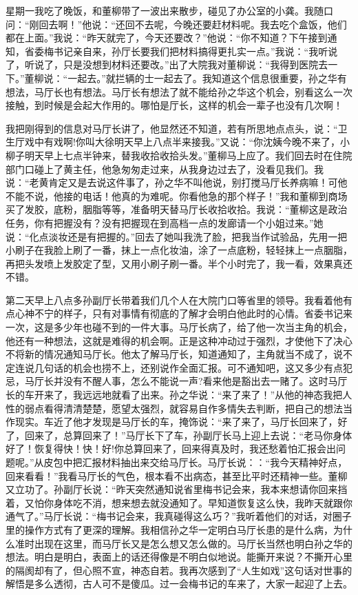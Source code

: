 \documentclass[12pt,oneside]{book}
\begin{document}
星期一我吃了晚饭，和董柳带了一波出来散步，碰见了办公室的小龚。我随口问：``刚回去啊！''他说：``还回不去呢，今晚还要赶材料呢。我去吃个盒饭，他们都在上面。''我说：``昨天就完了，今天还要改？''他说：``你不知道？下午接到通知，省委梅书记亲自来，孙厅长要我们把材料搞得更扎实一点。''我说：``我听说了，听说了，只是没想到材料还要改。''出了大院我对董柳说：``我得到医院去一下。''董柳说：``一起去。''就拦辆的士一起去了。我知道这个信息很重要，孙之华有想法，马厅长也有想法。马厅长有想法了就不能给孙之华这个机会，别看这么一次接触，到时候是会起大作用的。哪怕是厅长，这样的机会一辈子也没有几次啊！

我把刚得到的信息对马厅长讲了，他显然还不知道，若有所思地点点头，说：``卫生厅戏中有戏啊!你叫大徐明天早上八点半来接我。''又说：``你沈姨今晚不来了，小柳子明天早上七点半钟来，替我收拾收拾头发。''董柳马上应了。我们回去时在住院部门口碰上了黄主任，他急匆匆走过来，从我身边过去了，没看见我们。我说：``老黄肯定又是去说这件事了，孙之华不叫他说，别打搅马厅长养病嘛！可他不能不说，他接的电话！他真的为难呢。你看他急的那个样子！''我和董柳到商场买了发胶，底粉，胭脂等等，准备明天替马厅长收拾收拾。我说：``董柳这是政治任务，你有把握没有？没有把握现在到高档一点的发廊请一个小姐过来。''她说：``化点淡妆还是有把握的。''回去了她叫我洗了脸，把我当作试验品，先用一把小刷子在我脸上刷了一番，抹上一点化妆油，涂了一点底粉，轻轻抹上一点胭脂，再把头发喷上发胶定了型，又用小刷子刷一番。半个小时完了，我一看，效果真还不错。

第二天早上八点多孙副厅长带着我们几个人在大院门口等省里的领导。我看着他有点心神不宁的样子，只有对事情有彻底的了解才会明白他此时的心情。省委书记来一次，这是多少年也碰不到的一件大事。马厅长病了，给了他一次当主角的机会，他还有一种想法，这就是难得的机会啊。正是这种冲动过于强烈，才使他下了决心不将新的情况通知马厅长。他太了解马厅长，知道通知了，主角就当不成了，说不定连说几句话的机会也捞不上，还别说作全面汇报。可不通知吧，这又多少有点犯忌，马厅长并没有不醒人事，怎么不能说一声?看来他是豁出去一赌了。这时马厅长的车开来了，我远远地就看了出来。孙之华说：``来了来了！''从他的神态我把人性的弱点看得清清楚楚，愿望太强烈，就容易自作多情失去判断，把自己的想法当作现实。车近了他才发现是马厅长的车，掩饰说：``来了来了，马厅长回来了，好了，回来了，总算回来了！''马厅长下了车，孙副厅长马上迎上去说：``老马你身体好了！恢复得快！快！好!你总算回来了，回来得真及时，我还愁着怕汇报会出问题呢。''从皮包中把汇报材料抽出来交给马厅长。马厅长说：：``我今天精神好点，回来看看！''我看马厅长的气色，根本看不出病态，甚至比平时还精神一些。董柳又立功了。孙副厅长说：``昨天突然通知说省里梅书记会来，我本来想请你回来挡着，又怕你身体吃不消，想来想去就没通知了。早知道恢复这么快，我昨天就跟你通气了。''马厅长说：``梅书记会来，我真碰得这么巧？''我听着他们的对话，对圈子里的操作方式有了更深的理解。我相信孙之华一定明白马厅长患的是什么病，为什么准时出现在这里，而马厅长又是怎么想又怎么做的。马厅长当然也明白孙之华的想法。明白是明白，表面上的话还得像是不明白似地说。能撕开来说？不撕开心里的隔阂却有了，但心照不宣，神态自若。我再次感到了``人生如戏''这句话对世事的解悟是多么透彻，古人可不是傻瓜。过一会梅书记的车来了，大家一起迎了上去。
\end{document}
